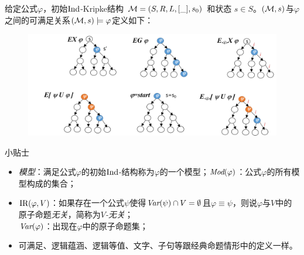 \documentclass[9pt, CJK]{beamer}
\begin{document}
\begin{frame}
{\begin{definition}
			给定公式$\varphi$，初始$\textrm{Ind}$-Kripke结构 ${\cal M}=(S,R,L,[\_],s_0)$ 和状态 $s\in S$。$({\cal M},s)$与$\varphi$之间的可满足关系$({\cal M},s)\models \varphi$定义如下：
			\begin{figure}
				\includegraphics[scale=0.3]{figures/semanticCTL}
			\end{figure}
	\end{definition}%
\begin{block}{{\footnotesize 小贴士}}
	\tiny{
		\begin{itemize}
			\item {\em 模型}：满足公式$\varphi$的初始$\textrm{Ind}$-结构称为$\varphi$的一个模型；\qquad $\textit{Mod}(\varphi)$：公式$\varphi$的所有模型构成的集合； 
			\item $\textrm{IR}(\varphi,V)$：如果存在一个公式$\psi$使得$\textit{Var}(\psi) \cap V = \emptyset$且$\varphi \equiv \psi$，则说$\varphi$与$V$中的原子命题\emph{无关}，简称为\emph{$V$-无关}；\\ $\textit{Var}(\varphi)$：出现在$\varphi$中的原子命题集；
			\item 可满足、逻辑蕴涵、逻辑等值、文字、子句等跟经典命题情形中的定义一样。
		\end{itemize}
	}
\end{block}
}
\end{frame}
\end{document}
